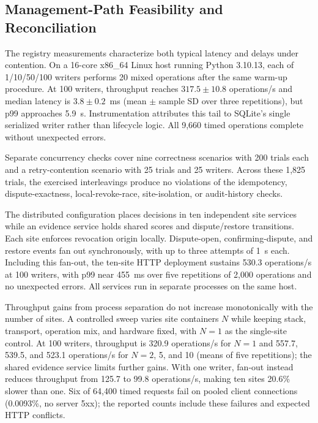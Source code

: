 \documentclass[journal]{IEEEtran}
\theoremstyle{definition}
\begin{document}
\subsection{Management-Path Feasibility and Reconciliation}
\label{sec:scalability-results}
The registry measurements characterize both typical latency and delays under contention. On a 16-core x86\_64 Linux host running Python 3.10.13, each of 1/10/50/100 writers performs 20 mixed operations after the same warm-up procedure. At 100 writers, throughput reaches $317.5\pm10.8$ operations/s and median latency is $3.8\pm0.2$~ms (mean $\pm$ sample SD over three repetitions), but p99 approaches 5.9~s. Instrumentation attributes this tail to SQLite's single serialized writer rather than lifecycle logic. All 9,660 timed operations complete without unexpected errors.

Separate concurrency checks cover nine correctness scenarios with 200 trials each and a retry-contention scenario with 25 trials and 25 writers. Across these 1,825 trials, the exercised interleavings produce no violations of the idempotency, dispute-exactness, local-revoke-race, site-isolation, or audit-history checks.

The distributed configuration places decisions in ten independent site services while an evidence service holds shared scores and dispute/restore transitions. Each site enforces revocation origin locally. Dispute-open, confirming-dispute, and restore events fan out synchronously, with up to three attempts of 1~s each. Including this fan-out, the ten-site HTTP deployment sustains 530.3 operations/s at 100 writers, with p99 near 455~ms over five repetitions of 2,000 operations and no unexpected errors. All services run in separate processes on the same host.

Throughput gains from process separation do not increase monotonically with the number of sites. A controlled sweep varies site containers $N$ while keeping stack, transport, operation mix, and hardware fixed, with $N=1$ as the single-site control. At 100 writers, throughput is 320.9 operations/s for $N=1$ and 557.7, 539.5, and 523.1 operations/s for $N=2$, 5, and 10 (means of five repetitions); the shared evidence service limits further gains. With one writer, fan-out instead reduces throughput from 125.7 to 99.8 operations/s, making ten sites 20.6\% slower than one. Six of 64,400 timed requests fail on pooled client connections (0.0093\%, no server 5xx); the reported counts include these failures and expected HTTP conflicts.
\end{document}
